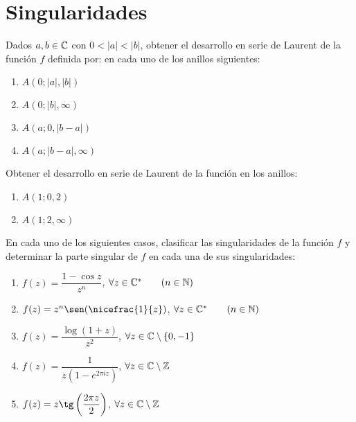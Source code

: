 \section{Singularidades}

\begin{ejercicio}
    Dados $a, b \in \mathbb{C}$ con $0 < |a| < |b|$, obtener el desarrollo en serie de Laurent de la función $f$ definida por:
    en cada uno de los anillos siguientes:
    \begin{enumerate}
        \item $A(0; |a|, |b|)$
        \item $A(0; |b|, \infty)$
        \item $A(a; 0, |b - a|)$
        \item $A(a; |b - a|, \infty)$
    \end{enumerate}
\end{ejercicio}

\begin{ejercicio}
    Obtener el desarrollo en serie de Laurent de la función
    en los anillos:
    \begin{enumerate}
        \item $A(1; 0, 2)$
        \item $A(1; 2, \infty)$
    \end{enumerate}
\end{ejercicio}

\begin{ejercicio}
    En cada uno de los siguientes casos, clasificar las singularidades de la función $f$ y determinar la parte singular de $f$ en cada una de sus singularidades:
    \begin{enumerate}
        \item $f(z) = \dfrac{1 - \cos z}{z^n}$, $\forall z \in \mathbb{C}^*\qquad (n \in \mathbb{N})$
        \item $f(z) = z^n \sen(\nicefrac{1}{z})$, $\forall z \in \mathbb{C}^*\qquad (n \in \mathbb{N})$
        \item $f(z) = \dfrac{\log(1 + z)}{z^2}$, $\forall z \in \mathbb{C} \setminus \{0, -1\}$
        \item $f(z) = \dfrac{1}{z(1 - e^{2\pi i z})}$, $\forall z \in \mathbb{C} \setminus \mathbb{Z}$
        \item $f(z) = z \tg\left(\dfrac{2\pi z}{2}\right)$, $\forall z \in \mathbb{C} \setminus \mathbb{Z}$
    \end{enumerate}
\end{ejercicio}

